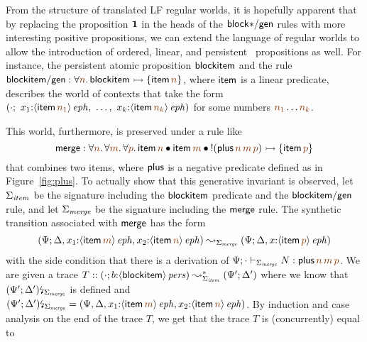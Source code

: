 From the structure of translated LF regular worlds, it is hopefully
apparent that by replacing the proposition $\mathbf{1}$ in the heads of the
${\sf block{*}/gen}$ rules with more interesting positive
\sls propositions,  we can extend the language of regular
worlds to allow the introduction of ordered, linear, and persistent
\sls~propositions as well. For instance, the persistent atomic proposition
${\sf blockitem}$ and the rule
${\sf blockitem/gen} : 
\forall \lf{n}. \, {\sf blockitem} \lefti \{ {\sf item}\,\lf{n} \}$,
where ${\sf item}$ is a linear predicate,
describes the world of contexts that take the form
$\left(\cdot; ~ x_1{:}\iseph{\susp{{\sf item}\,\lf{n_1}}}, ~
         \ldots, ~
         x_k{:}\iseph{\susp{{\sf item}\,\lf{n_k}}}\right)$
for some numbers $\lf{n_1}\ldots\lf{n_k}$. 

This world, furthermore, is preserved
under a rule like 
\[
  {\sf merge} : 
  \forall \lf{n}.\,\forall\lf{m}.\,\forall\lf{p}.\,
   {\sf item}\,\lf{n} \fuse
   {\sf item}\,\lf{m} \fuse
   {!}({\sf plus}\,\lf{n}\,\lf{m}\,\lf{p}) 
    \lefti \{ {\sf item}\,\lf{p} \}
\]
that combines two items, 
where ${\sf plus}$ is a negative predicate defined as in 
Figure~\ref{fig:plus}.  
To actually show that this generative invariant is observed, let
$\Sigma_{\it item}$ be the signature including the ${\sf blockitem}$
predicate and the ${\sf blockitem/gen}$ rule, and let $\Sigma_{\it
  merge}$ be the signature including the ${\sf merge}$ rule. 
The synthetic transition associated with ${\sf merge}$ 
has the form 
\[
(\Psi; \Delta, x_1{:}\iseph{\susp{{\sf item}\,\lf{m}}},
          x_2{:}\iseph{\susp{{\sf item}\,\lf{n}}}) 
\leadsto_{\Sigma_{\it merge}} 
 (\Psi; \Delta, x{:}\iseph{\susp{{\sf item}\,\lf{p}}})\]
with the side condition that there is a derivation
of $\Psi; \cdot \vdash_{\Sigma_{\it merge}} N : 
    {\sf plus}\,\lf{n}\,\lf{m}\,\lf{p}$. 
We are given a trace
$T :: (\cdot; b{:}{\langle {{\sf blockitem}} \rangle}\,{{\it pers}}) \leadsto^*_{\Sigma_{\it item}}
     (\Psi'; \Delta')$ where we know that
${(\Psi'; \Delta')}{\mbox{\lightning}}_{\Sigma_{\it merge}}$ is defined and
$\restrictsig{(\Psi'; \Delta')}{\Sigma_{\it merge}} = 
 (\Psi, \Delta, x_1{:}\iseph{\susp{{\sf item}\,\lf{m}}},
          x_2{:}\iseph{\susp{{\sf item}\,\lf{n}}})$. By induction
and case analysis on the end of the trace $T$, we get that 
the trace $T$ is (concurrently) equal to 
